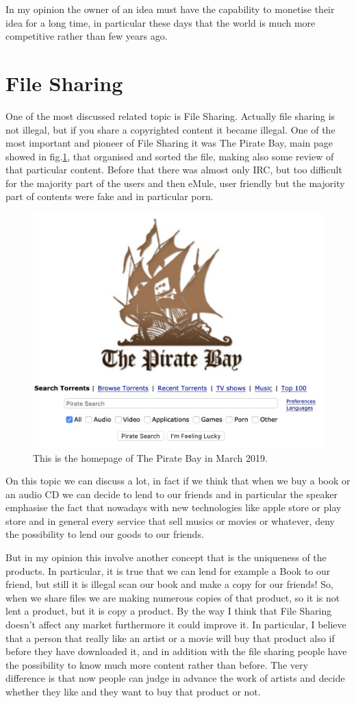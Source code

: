 \documentclass{article}
\begin{document}
    In my opinion the owner of an idea must have the capability to monetise their idea for a long time, in particular these days that the world is much more competitive rather than few years ago.
    
\section{File Sharing}
    One of the most discussed related topic is File Sharing. Actually file sharing is not illegal, but if you share a copyrighted content it became illegal. One of the most important and pioneer of File Sharing it was The Pirate Bay, main page showed in fig.\ref{fig:piratebay}, that organised and sorted the file, making also some review of that particular content. Before that there was almost only IRC, but too difficult for the majority part of the users and then eMule, user friendly but the majority part of contents were fake and in particular porn.
     \begin{figure}
        \centering
        \includegraphics[width=0.5\linewidth]{piratebay.png}
        \caption{This is the homepage of The Pirate Bay in March 2019.}
        \label{fig:piratebay}
    \end{figure}
    
    On this topic we can discuss a lot, in fact if we think that when we buy a book or an audio CD we can decide to lend to our friends and in particular the speaker emphasise the fact that nowadays with new technologies like apple store or play store and in general every service that sell musics or movies or whatever, deny the possibility to lend our goods to our friends.
    
    But in my opinion this involve another concept that is the uniqueness of the products. In particular, it is true that we can lend for example a Book to our friend, but still it is illegal scan our book and make a copy for our friends! So, when we share files we are making numerous copies of that product, so it is not lent a product, but it is copy a product. By the way I think that File Sharing doesn't affect any market furthermore it could improve it. In particular, I believe that a person that really like an artist or a movie will buy that product also if before they have downloaded it, and in addition with the file sharing people have the possibility to know much more content rather than before. The very difference is that now people can judge in advance the work of artists and decide whether they like and they want to buy that product or not.
\end{document}
